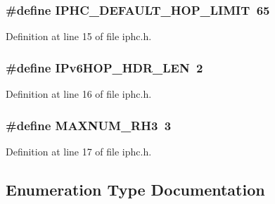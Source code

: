\subsubsection[{\texorpdfstring{I\+P\+H\+C\+\_\+\+D\+E\+F\+A\+U\+L\+T\+\_\+\+H\+O\+P\+\_\+\+L\+I\+M\+IT}{IPHC_DEFAULT_HOP_LIMIT}}]{\setlength{\rightskip}{0pt plus 5cm}\#define I\+P\+H\+C\+\_\+\+D\+E\+F\+A\+U\+L\+T\+\_\+\+H\+O\+P\+\_\+\+L\+I\+M\+IT~65}\hypertarget{group___i_p_h_c_ga320b1d67b93309eeedfa96d2505816c1}{}\label{group___i_p_h_c_ga320b1d67b93309eeedfa96d2505816c1}


Definition at line 15 of file iphc.\+h.

\subsubsection[{\texorpdfstring{I\+Pv6\+H\+O\+P\+\_\+\+H\+D\+R\+\_\+\+L\+EN}{IPv6HOP_HDR_LEN}}]{\setlength{\rightskip}{0pt plus 5cm}\#define I\+Pv6\+H\+O\+P\+\_\+\+H\+D\+R\+\_\+\+L\+EN~2}\hypertarget{group___i_p_h_c_ga251d45c44deb607ae20f0844cb4428c0}{}\label{group___i_p_h_c_ga251d45c44deb607ae20f0844cb4428c0}


Definition at line 16 of file iphc.\+h.

\subsubsection[{\texorpdfstring{M\+A\+X\+N\+U\+M\+\_\+\+R\+H3}{MAXNUM_RH3}}]{\setlength{\rightskip}{0pt plus 5cm}\#define M\+A\+X\+N\+U\+M\+\_\+\+R\+H3~3}\hypertarget{group___i_p_h_c_ga4ec48eab341b4cbcbc00238435f650e2}{}\label{group___i_p_h_c_ga4ec48eab341b4cbcbc00238435f650e2}


Definition at line 17 of file iphc.\+h.



\subsection{Enumeration Type Documentation}
